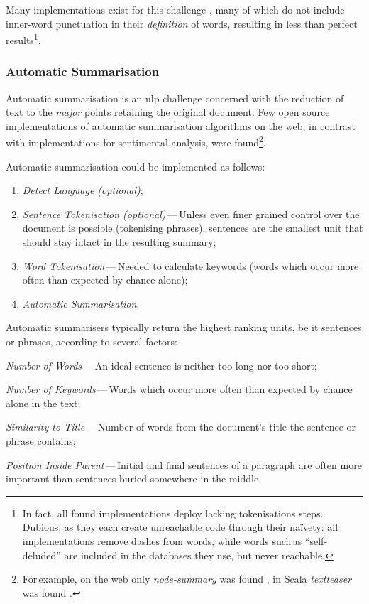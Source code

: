 Many implementations exist for this challenge
  \autocites{thinkroth/sentimental-source-code}{mileszim/sediment-source-code}
  {thisandagain/sentiment-source-code}, many of which do not include
  inner-word punctuation in their \emph{definition} of words, resulting in
  less than perfect results\footnote{In fact, all found implementations
      deploy lacking tokenisations steps.
    Dubious, as they each create unreachable code through their na\"ivety:
      all implementations remove dashes from words, while words such\,as
      ``self-deluded'' are included in the databases they use, but never
      reachable.}.

\subsubsection{Automatic Summarisation}\label{automatic-summarisation}

Automatic summarisation is an \gls{nlp} challenge concerned with the reduction
  of text to the \emph{major} points retaining the original document.
Few open source implementations of automatic summarisation algorithms on
  the web, in contrast with implementations for sentimental analysis, were
  found\footnote{For\,example, on the web only \emph{node-summary} was found
    \autocite{jbrooksuk/node-summary-source-code}, in Scala \emph{textteaser}
    was found \autocite{MojoJolo/textteaser-source-code}.}.

Automatic summarisation could be implemented as follows:

\begin{enumerate}
\item\emph{Detect Language (optional)};
\item\emph{Sentence Tokenisation (optional)}\,---\,Unless even finer grained
  control over the document is possible (tokenising phrases), sentences are
  the smallest unit that should stay intact in the resulting summary;
\item\emph{Word Tokenisation}\,---\,Needed to calculate keywords (words
  which occur more often than expected by chance alone);
\item\emph{Automatic Summarisation}.
\end{enumerate}

\noindent Automatic summarisers typically return the highest ranking units,
  be it sentences or phrases, according to several factors:

\begin{aenumerate}
\item\emph{Number of Words}\,---\,An ideal sentence is neither too long nor
  too short;
\item\emph{Number of Keywords}\,---\,Words which occur more often than
  expected by chance alone in the text;
\item\emph{Similarity to Title}\,---\,Number of words from the document's
  title the sentence or phrase contains;
\item\emph{Position Inside Parent}\,---\,Initial and final sentences of a
  paragraph are often more important than sentences buried somewhere in
  the middle.
\end{aenumerate}

